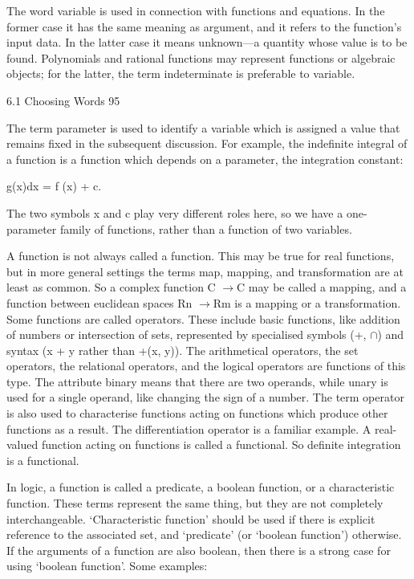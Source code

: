 \documentclass[11pt]{article}
\theoremstyle{plain}
\theoremstyle{definition}
\begin{document}
The word variable is used in connection with functions and equations. In the former case it has the same meaning as argument, and it refers to the function's input data. In the latter case it means unknown---a quantity whose value is to be found. Polynomials and rational functions may represent functions or algebraic objects; for the latter, the term indeterminate is preferable to variable.

6.1 Choosing Words 95

The term parameter is used to identify a variable which is assigned a value that remains fixed in the subsequent discussion. For example, the indefinite integral of a function is a function which depends on a parameter, the integration constant:

g(x)dx = f (x) + c.

The two symbols x and c play very different roles here, so we have a one-parameter family of functions, rather than a function of two variables.

A function is not always called a function. This may be true for real functions, but in more general settings the terms map, mapping, and transformation are at least as common. So a complex function C $\to$C may be called a mapping, and a function between euclidean spaces Rn $\to$Rm is a mapping or a transformation. Some functions are called operators. These include basic functions, like addition of numbers or intersection of sets, represented by specialised symbols (+, $\cap$) and syntax (x + y rather than +(x, y)). The arithmetical operators, the set operators, the relational operators, and the logical operators are functions of this type. The attribute binary means that there are two operands, while unary is used for a single operand, like changing the sign of a number. The term operator is also used to characterise functions acting on functions which produce other functions as a result. The differentiation operator is a familiar example. A real-valued function acting on functions is called a functional. So definite integration is a functional.

In logic, a function is called a predicate, a boolean function, or a characteristic function. These terms represent the same thing, but they are not completely interchangeable. `Characteristic function' should be used if there is explicit reference to the associated set, and `predicate' (or `boolean function') otherwise. If the arguments of a function are also boolean, then there is a strong case for using `boolean function'. Some examples:
\end{document}
